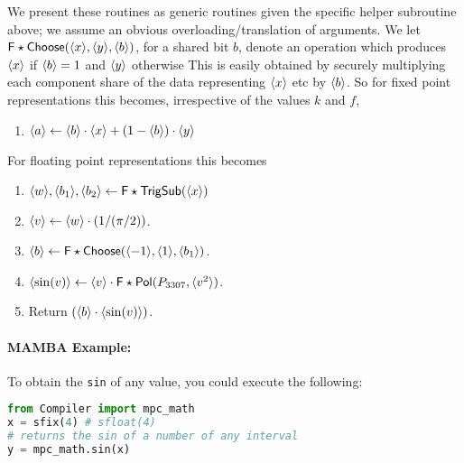 We present these routines as generic routines given the specific helper subroutine above;
we assume an obvious overloading/translation of arguments.
We let $\mathsf{F\star Choose}(\langle x \rangle,\langle y \rangle,\langle b \rangle)$, for a 
shared bit $b$, denote an operation which produces $\langle x \rangle$ if $\langle b \rangle=1$ 
and $\langle y \rangle$ otherwise
This is easily obtained by securely multiplying each component share
of the data representing $\langle x \rangle$ etc by $\langle b \rangle$.
So for fixed point representations this becomes, irrespective of the
values $k$ and $f$,
\begin{enumerate}
\item $\langle a \rangle \leftarrow \langle b \rangle\cdot \langle x \rangle+(1-\langle b \rangle) \cdot \langle y \rangle$
\end{enumerate}
For floating point representations this becomes
\begin{enumerate}
\item $\langle w \rangle, \langle b_1 \rangle, \langle b_2 \rangle \leftarrow \mathsf{F\star TrigSub}(\langle x \rangle)$
\item $\langle v \rangle \leftarrow \langle w \rangle \cdot (1/(\pi/2))$.
\item $\langle b \rangle \leftarrow \mathsf{F\star Choose}(\langle -1 \rangle,\langle 1 \rangle, \langle b_1 \rangle)$.
\item $\langle \sin(v) \rangle \leftarrow \langle v \rangle \cdot \mathsf{F\star Pol}(P_{3307},\langle v^2 \rangle)$.
\item Return $(\langle b \rangle \cdot \langle \sin(v) \rangle)$.
\end{enumerate}
%

\paragraph{MAMBA Example:} To obtain the \verb|sin| of any value, you could execute the following:
\begin{lstlisting}[language={python}]
from Compiler import mpc_math
x = sfix(4) # sfloat(4)
# returns the sin of a number of any interval
y = mpc_math.sin(x)
\end{lstlisting}

